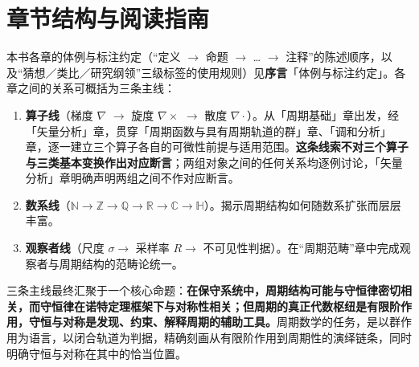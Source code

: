 \section*{章节结构与阅读指南}

本书各章的体例与标注约定（“定义 $\to$ 命题 $\to$ … $\to$ 注释”的陈述顺序，以及“猜想／类比／研究纲领”三级标签的使用规则）见\textbf{序言}「体例与标注约定」。各章之间的关系可概括为三条主线：

\begin{enumerate}[leftmargin=4em, label={(\arabic*)}]
    \item \textbf{算子线}（梯度 $\nabla$ $\to$ 旋度 $\nabla\times$ $\to$ 散度 $\nabla\cdot$）。从「周期基础」章出发，经「矢量分析」章，贯穿「周期函数与具有周期轨道的群」章、「调和分析」章，逐一建立三个算子各自的可微性前提与适用范围。\textbf{这条线索不对三个算子与三类基本变换作出对应断言}；两组对象之间的任何关系均逐例讨论，「矢量分析」章明确声明两组之间不作对应断言。
    \item \textbf{数系线}（$\mathbb{N} \to \mathbb{Z} \to \mathbb{Q} \to \mathbb{R} \to \mathbb{C} \to \mathbb{H}$）。揭示周期结构如何随数系扩张而层层丰富。
    \item \textbf{观察者线}（尺度 $\sigma \to$ 采样率 $R \to$ 不可见性判据）。在“周期范畴”章中完成观察者与周期结构的范畴论统一。
\end{enumerate}

三条主线最终汇聚于一个核心命题：\textbf{在保守系统中，周期结构可能与守恒律密切相关，而守恒律在诺特定理框架下与对称性相关；但周期的真正代数枢纽是有限阶作用，守恒与对称是发现、约束、解释周期的辅助工具。}周期数学的任务，是以群作用为语言，以闭合轨道为判据，精确刻画从有限阶作用到周期性的演绎链条，同时明确守恒与对称在其中的恰当位置。

